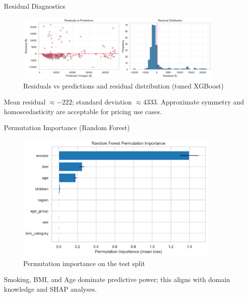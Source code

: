 \documentclass[10pt]{beamer}
\begin{document}
\begin{frame}{Residual Diagnostics}
\begin{figure}
\includegraphics[width=0.92\textwidth]{residual_analysis.png}
\caption{Residuals vs predictions and residual distribution (tuned XGBoost)}
\end{figure}
\vspace{-6pt}
\small Mean residual $\approx -222$; standard deviation $\approx 4333$. Approximate symmetry and homoscedasticity are acceptable for pricing use cases.
\end{frame}

\begin{frame}{Permutation Importance (Random Forest)}
\begin{figure}
\includegraphics[width=0.9\textwidth]{feature_importance.png}
\caption{Permutation importance on the test split}
\end{figure}
\small Smoking, BMI, and Age dominate predictive power; this aligns with domain knowledge and SHAP analyses.
\end{frame}
\end{document}
